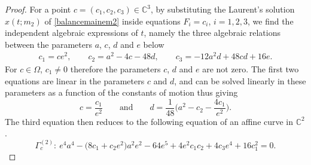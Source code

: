 \documentclass[10pt,a4paper]{amsart}
\numberwithin{equation}{section}
\begin{document}
\begin{proof}
For a point $c=(c_1,c_2,c_3) \in \mathbb{C}^3$, by
substituting the Laurent's solution $x(t;m_2)$ of
\eqref{balancemainem2} inside equations $F_i=c_i$, $i=1,2,3$, we find
the independent algebraic expressions of $t$, namely the three
algebraic relations between the parameters $a$, $c$, $d$ and $e$ below
\begin{eqnarray*}
 c_1 = ce^2, \qquad
 c_2 = a^2-4c-48d, \qquad
 c_3 = -12a^2d+48cd+16e.
\end{eqnarray*}
For $c\in \Omega$, $c_1\neq0$ therefore the parameters $c$, $d$ and $e$
are not zero. The first two equations are linear in the parameters
$c$ and $d$, and can be solved linearly in these parameters as a
function of the constants of motion thus giving
\begin{equation*}
 c=\frac{c_1}{e^2} \qquad \text{and} \qquad
 d=\frac{1}{48}\biggl(a^2-c_2-\frac{4c_1}{e^2}\biggr).
\end{equation*}
The third equation then reduces to the following equation of an
affine curve in $\mathbb{C}^2$.
\begin{equation}\label{courbeaffine}
 \Gamma_c^{(2)}\colon \ e^4a^4-\bigl(8c_1+c_2e^2\bigr)a^2e^2-64e^5+4e^2c_1c_2+4c_3e^4+16c_1^2=0.
\end{equation}


\end{proof}
\end{document}
